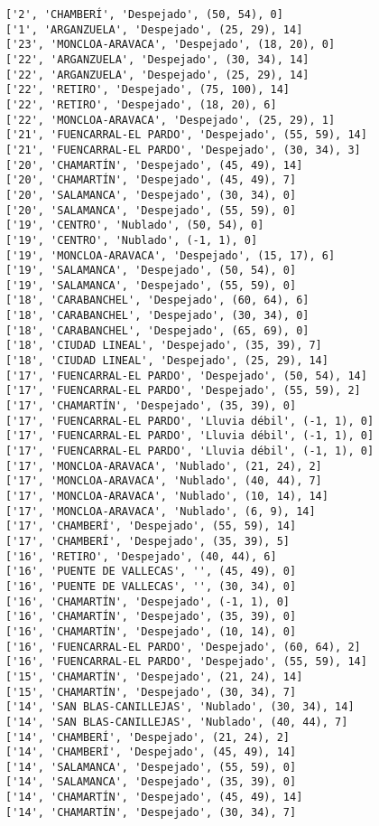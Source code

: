 \documentclass[11pt]{article}
\begin{document}
\begin{Verbatim}[commandchars=\\\{\}]
['2', 'CHAMBERÍ', 'Despejado', (50, 54), 0]
['1', 'ARGANZUELA', 'Despejado', (25, 29), 14]
['23', 'MONCLOA-ARAVACA', 'Despejado', (18, 20), 0]
['22', 'ARGANZUELA', 'Despejado', (30, 34), 14]
['22', 'ARGANZUELA', 'Despejado', (25, 29), 14]
['22', 'RETIRO', 'Despejado', (75, 100), 14]
['22', 'RETIRO', 'Despejado', (18, 20), 6]
['22', 'MONCLOA-ARAVACA', 'Despejado', (25, 29), 1]
['21', 'FUENCARRAL-EL PARDO', 'Despejado', (55, 59), 14]
['21', 'FUENCARRAL-EL PARDO', 'Despejado', (30, 34), 3]
['20', 'CHAMARTÍN', 'Despejado', (45, 49), 14]
['20', 'CHAMARTÍN', 'Despejado', (45, 49), 7]
['20', 'SALAMANCA', 'Despejado', (30, 34), 0]
['20', 'SALAMANCA', 'Despejado', (55, 59), 0]
['19', 'CENTRO', 'Nublado', (50, 54), 0]
['19', 'CENTRO', 'Nublado', (-1, 1), 0]
['19', 'MONCLOA-ARAVACA', 'Despejado', (15, 17), 6]
['19', 'SALAMANCA', 'Despejado', (50, 54), 0]
['19', 'SALAMANCA', 'Despejado', (55, 59), 0]
['18', 'CARABANCHEL', 'Despejado', (60, 64), 6]
['18', 'CARABANCHEL', 'Despejado', (30, 34), 0]
['18', 'CARABANCHEL', 'Despejado', (65, 69), 0]
['18', 'CIUDAD LINEAL', 'Despejado', (35, 39), 7]
['18', 'CIUDAD LINEAL', 'Despejado', (25, 29), 14]
['17', 'FUENCARRAL-EL PARDO', 'Despejado', (50, 54), 14]
['17', 'FUENCARRAL-EL PARDO', 'Despejado', (55, 59), 2]
['17', 'CHAMARTÍN', 'Despejado', (35, 39), 0]
['17', 'FUENCARRAL-EL PARDO', 'Lluvia débil', (-1, 1), 0]
['17', 'FUENCARRAL-EL PARDO', 'Lluvia débil', (-1, 1), 0]
['17', 'FUENCARRAL-EL PARDO', 'Lluvia débil', (-1, 1), 0]
['17', 'MONCLOA-ARAVACA', 'Nublado', (21, 24), 2]
['17', 'MONCLOA-ARAVACA', 'Nublado', (40, 44), 7]
['17', 'MONCLOA-ARAVACA', 'Nublado', (10, 14), 14]
['17', 'MONCLOA-ARAVACA', 'Nublado', (6, 9), 14]
['17', 'CHAMBERÍ', 'Despejado', (55, 59), 14]
['17', 'CHAMBERÍ', 'Despejado', (35, 39), 5]
['16', 'RETIRO', 'Despejado', (40, 44), 6]
['16', 'PUENTE DE VALLECAS', '', (45, 49), 0]
['16', 'PUENTE DE VALLECAS', '', (30, 34), 0]
['16', 'CHAMARTÍN', 'Despejado', (-1, 1), 0]
['16', 'CHAMARTÍN', 'Despejado', (35, 39), 0]
['16', 'CHAMARTÍN', 'Despejado', (10, 14), 0]
['16', 'FUENCARRAL-EL PARDO', 'Despejado', (60, 64), 2]
['16', 'FUENCARRAL-EL PARDO', 'Despejado', (55, 59), 14]
['15', 'CHAMARTÍN', 'Despejado', (21, 24), 14]
['15', 'CHAMARTÍN', 'Despejado', (30, 34), 7]
['14', 'SAN BLAS-CANILLEJAS', 'Nublado', (30, 34), 14]
['14', 'SAN BLAS-CANILLEJAS', 'Nublado', (40, 44), 7]
['14', 'CHAMBERÍ', 'Despejado', (21, 24), 2]
['14', 'CHAMBERÍ', 'Despejado', (45, 49), 14]
['14', 'SALAMANCA', 'Despejado', (55, 59), 0]
['14', 'SALAMANCA', 'Despejado', (35, 39), 0]
['14', 'CHAMARTÍN', 'Despejado', (45, 49), 14]
['14', 'CHAMARTÍN', 'Despejado', (30, 34), 7]

\end{Verbatim}
\end{document}
